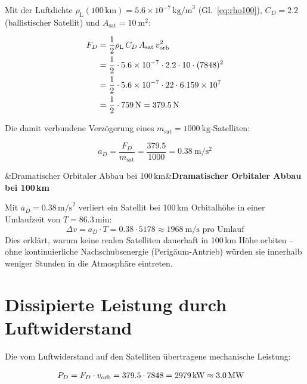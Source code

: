 ﻿\documentclass[12pt, a4paper]{report}
\newenvironment{wichtig}[1][]{%
  \begin{wichtigframe}\sloppy%
  \ifx&#1&\else\textbf{#1}\par\smallskip\fi}{\end{wichtigframe}}
\theoremstyle{definition}
\theoremstyle{remark}
\newcommand{\rhoL}{\rho_{\text{L}}}
\begin{document}
Mit der Luftdichte $\rhoL(100\,\text{km}) = 5.6 \times 10^{-7}\,\text{kg/m}^3$
(Gl.~\eqref{eq:rho100}), $C_D = 2.2$ (ballistischer Satellit) und
$A_{\text{sat}} = \SI{10}{\metre\squared}$:

\begin{align}
  F_D &= \frac{1}{2} \rhoL \, C_D \, A_{\text{sat}} \, v_{\text{orb}}^2 \notag \\
  &= \frac{1}{2} \cdot 5.6 \times 10^{-7} \cdot 2.2 \cdot 10 \cdot (7848)^2 \notag \\
  &= \frac{1}{2} \cdot 5.6 \times 10^{-7} \cdot 22 \cdot 6.159 \times 10^7 \notag \\
  &= \frac{1}{2} \cdot 759\,\text{N} = \SI{379.5}{\newton}
  \label{eq:fd_sat_100}
\end{align}

Die damit verbundene Verzögerung eines $m_{\text{sat}} = \SI{1000}{\kilo\gram}$-Satelliten:

\begin{equation}
  a_D = \frac{F_D}{m_{\text{sat}}} = \frac{379.5}{1000} = \SI{0.38}{\metre\per\second\squared}
  \label{eq:a_drag_sat}
\end{equation}

\begin{wichtig}[Dramatischer Orbitaler Abbau bei 100\,km]
  Mit $a_D = 0.38\,\text{m/s}^2$ verliert ein Satellit bei 100\,km Orbitalhöhe
  in einer Umlaufzeit von $T = 86.3\,\text{min}$:
  \begin{equation}
    \Delta v = a_D \cdot T = 0.38 \cdot 5178 \approx \SI{1968}{\metre\per\second}\text{ pro Umlauf}
  \end{equation}
  Dies erklärt, warum keine realen Satelliten dauerhaft in 100\,km Höhe orbiten --
  ohne kontinuierliche Nachschubsenergie (Perigäum-Antrieb) würden sie innerhalb
  weniger Stunden in die Atmosphäre eintreten.
\end{wichtig}

\section{Dissipierte Leistung durch Luftwiderstand}

Die vom Luftwiderstand auf den Satelliten übertragene mechanische Leistung:

\begin{align}
  P_D &= F_D \cdot v_{\text{orb}} = 379.5 \cdot 7848 = \SI{2\,979}{\kilo\watt} \approx \SI{3.0}{\mega\watt}
  \label{eq:pd_sat}
\end{align}
\end{document}
